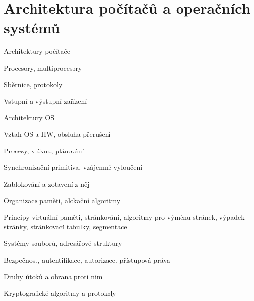 \section{Architektura počítačů a operačních systémů}
\begin{pozadavky}
\begin{pitemize}
\item Architektury počítače
\item Procesory, multiprocesory
\item Sběrnice, protokoly
\item Vstupní a výstupní zařízení
\item Architektury OS
\item Vztah OS a HW, obsluha přerušení
\item Procesy, vlákna, plánování
\item Synchronizační primitiva, vzájemné vyloučení
\item Zablokování a zotavení z něj
\item Organizace paměti, alokační algoritmy
\item Principy virtuální paměti, stránkování, algoritmy pro výměnu stránek, výpadek stránky, stránkovací tabulky, segmentace
\item Systémy souborů, adresářové struktury
\item Bezpečnost, autentifikace, autorizace, přístupová práva
\item Druhy útoků a obrana proti nim
\item Kryptografické algoritmy a protokoly
\end{pitemize}
\end{pozadavky}
















